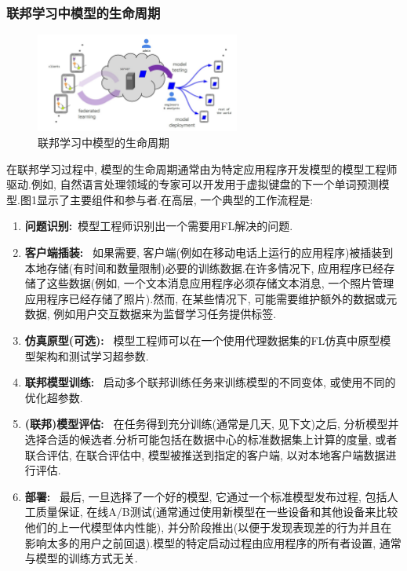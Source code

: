 \documentclass[a4paper]{article}
\begin{document}
    \subsubsection{联邦学习中模型的生命周期}
    \begin{figure}[ht]
        \setlength{\abovecaptionskip}{0.1cm}
        \centering    
        \includegraphics[width=0.6\textwidth]{life_circle.jpg}
        \caption{联邦学习中模型的生命周期}
    \end{figure}
在联邦学习过程中, 模型的生命周期通常由为特定应用程序开发模型的模型工程师驱动.例如, 自然语言处理领域的专家可以开发用于虚拟键盘的下一个单词预测模型.图1显示了主要组件和参与者.在高层, 一个典型的工作流程是:
\begin{enumerate}
\item	\textbf{问题识别:}\ 模型工程师识别出一个需要用FL解决的问题.
\item	\textbf{客户端插装:} \ 如果需要, 客户端(例如在移动电话上运行的应用程序)被插装到本地存储(有时间和数量限制)必要的训练数据.在许多情况下, 应用程序已经存储了这些数据(例如, 一个文本消息应用程序必须存储文本消息, 一个照片管理应用程序已经存储了照片).然而, 在某些情况下, 可能需要维护额外的数据或元数据, 例如用户交互数据来为监督学习任务提供标签.
\item	\textbf{仿真原型(可选):} \ 模型工程师可以在一个使用代理数据集的FL仿真中原型模型架构和测试学习超参数.
\item	\textbf{联邦模型训练:} \ 启动多个联邦训练任务来训练模型的不同变体, 或使用不同的优化超参数.
\item	\textbf{(联邦)模型评估:} \ 在任务得到充分训练(通常是几天, 见下文)之后, 分析模型并选择合适的候选者.分析可能包括在数据中心的标准数据集上计算的度量, 或者联合评估, 在联合评估中, 模型被推送到指定的客户端, 以对本地客户端数据进行评估.
\item	\textbf{部署:} \ 最后, 一旦选择了一个好的模型, 它通过一个标准模型发布过程, 包括人工质量保证, 在线A/B测试(通常通过使用新模型在一些设备和其他设备来比较他们的上一代模型体内性能), 并分阶段推出(以便于发现表现差的行为并且在影响太多的用户之前回退).模型的特定启动过程由应用程序的所有者设置, 通常与模型的训练方式无关.
\end{enumerate}
 
\end{document}
